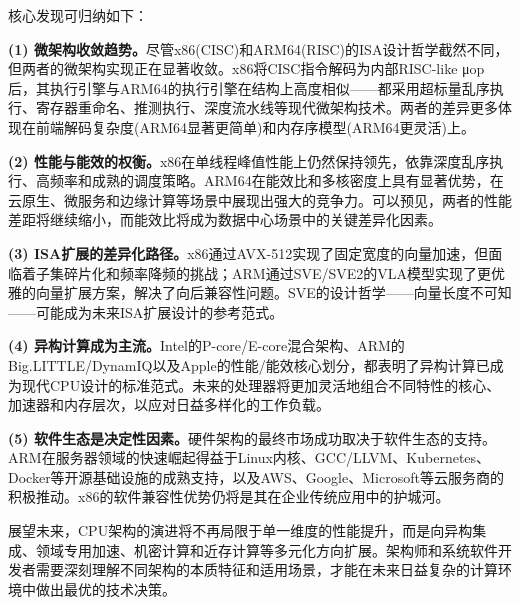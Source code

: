 \documentclass[12pt,a4paper]{IEEEtran}
\begin{document}
核心发现可归纳如下：

\textbf{(1) 微架构收敛趋势。}尽管x86(CISC)和ARM64(RISC)的ISA设计哲学截然不同，但两者的微架构实现正在显著收敛。x86将CISC指令解码为内部RISC-like μop后，其执行引擎与ARM64的执行引擎在结构上高度相似——都采用超标量乱序执行、寄存器重命名、推测执行、深度流水线等现代微架构技术。两者的差异更多体现在前端解码复杂度(ARM64显著更简单)和内存序模型(ARM64更灵活)上。

\textbf{(2) 性能与能效的权衡。}x86在单线程峰值性能上仍然保持领先，依靠深度乱序执行、高频率和成熟的调度策略。ARM64在能效比和多核密度上具有显著优势，在云原生、微服务和边缘计算等场景中展现出强大的竞争力。可以预见，两者的性能差距将继续缩小，而能效比将成为数据中心场景中的关键差异化因素。

\textbf{(3) ISA扩展的差异化路径。}x86通过AVX-512实现了固定宽度的向量加速，但面临着子集碎片化和频率降频的挑战；ARM通过SVE/SVE2的VLA模型实现了更优雅的向量扩展方案，解决了向后兼容性问题。SVE的设计哲学——向量长度不可知——可能成为未来ISA扩展设计的参考范式。

\textbf{(4) 异构计算成为主流。}Intel的P-core/E-core混合架构、ARM的Big.LITTLE/DynamIQ以及Apple的性能/能效核心划分，都表明了异构计算已成为现代CPU设计的标准范式。未来的处理器将更加灵活地组合不同特性的核心、加速器和内存层次，以应对日益多样化的工作负载。

\textbf{(5) 软件生态是决定性因素。}硬件架构的最终市场成功取决于软件生态的支持。ARM在服务器领域的快速崛起得益于Linux内核、GCC/LLVM、Kubernetes、Docker等开源基础设施的成熟支持，以及AWS、Google、Microsoft等云服务商的积极推动。x86的软件兼容性优势仍将是其在企业传统应用中的护城河。

展望未来，CPU架构的演进将不再局限于单一维度的性能提升，而是向异构集成、领域专用加速、机密计算和近存计算等多元化方向扩展。架构师和系统软件开发者需要深刻理解不同架构的本质特征和适用场景，才能在未来日益复杂的计算环境中做出最优的技术决策。
\end{document}
